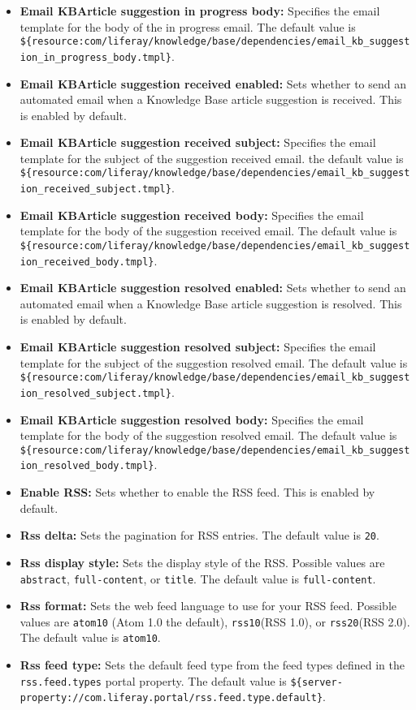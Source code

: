 \begin{itemize}
\item
  \textbf{Email KBArticle suggestion in progress body:} Specifies the
  email template for the body of the in progress email. The default
  value is
  \texttt{\$\{resource:com/liferay/knowledge/base/dependencies/email\_kb\_suggestion\_in\_progress\_body.tmpl\}}.
\item
  \textbf{Email KBArticle suggestion received enabled:} Sets whether to
  send an automated email when a Knowledge Base article suggestion is
  received. This is enabled by default.
\item
  \textbf{Email KBArticle suggestion received subject:} Specifies the
  email template for the subject of the suggestion received email. the
  default value is
  \texttt{\$\{resource:com/liferay/knowledge/base/dependencies/email\_kb\_suggestion\_received\_subject.tmpl\}}.
\item
  \textbf{Email KBArticle suggestion received body:} Specifies the email
  template for the body of the suggestion received email. The default
  value is
  \texttt{\$\{resource:com/liferay/knowledge/base/dependencies/email\_kb\_suggestion\_received\_body.tmpl\}}.
\item
  \textbf{Email KBArticle suggestion resolved enabled:} Sets whether to
  send an automated email when a Knowledge Base article suggestion is
  resolved. This is enabled by default.
\item
  \textbf{Email KBArticle suggestion resolved subject:} Specifies the
  email template for the subject of the suggestion resolved email. The
  default value is
  \texttt{\$\{resource:com/liferay/knowledge/base/dependencies/email\_kb\_suggestion\_resolved\_subject.tmpl\}}.
\item
  \textbf{Email KBArticle suggestion resolved body:} Specifies the email
  template for the body of the suggestion resolved email. The default
  value is
  \texttt{\$\{resource:com/liferay/knowledge/base/dependencies/email\_kb\_suggestion\_resolved\_body.tmpl\}}.
\item
  \textbf{Enable RSS:} Sets whether to enable the RSS feed. This is
  enabled by default.
\item
  \textbf{Rss delta:} Sets the pagination for RSS entries. The default
  value is \texttt{20}.
\item
  \textbf{Rss display style:} Sets the display style of the RSS.
  Possible values are \texttt{abstract}, \texttt{full-content}, or
  \texttt{title}. The default value is \texttt{full-content}.
\item
  \textbf{Rss format:} Sets the web feed language to use for your RSS
  feed. Possible values are \texttt{atom10} (Atom 1.0 the default),
  \texttt{rss10}(RSS 1.0), or \texttt{rss20}(RSS 2.0). The default value
  is \texttt{atom10}.
\item
  \textbf{Rss feed type:} Sets the default feed type from the feed types
  defined in the \texttt{rss.feed.types} portal property. The default
  value is
  \texttt{\$\{server-property://com.liferay.portal/rss.feed.type.default\}}.
\end{itemize}

